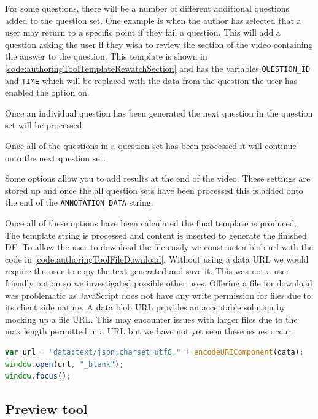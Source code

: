 For some questions, there will be a number of different additional questions added to the question set. One example is when the author has selected that a user may return to a specific point if they fail a question. This will add a question asking the user if they wish to review the section of the video containing the answer to the question. This template is shown in \autoref{code:authoringToolTemplateRewatchSection} and has the variables \lstinline|QUESTION_ID| and \lstinline|TIME| which will be replaced with the data from the question the user has enabled the option on.

Once an individual question has been generated the next question in the question set will be processed.

Once all of the questions in a question set has been processed it will continue onto the next question set.

Some options allow you to add results at the end of the video. These settings are stored up and once the all question sets have been processed this is added onto the end of the \lstinline|ANNOTATION_DATA| string.

Once all of these options have been calculated the final template is produced. The template string is processed and content is inserted to generate the finished \gls{DF}. To allow the user to download the file easily we construct a blob url with the code in \autoref{code:authoringToolFileDownload}. Without using a data URL we would require the user to copy the text generated and save it. This was not a user friendly option so we investigated possible other uses. Offering a file for download was problematic as JavaScript does not have any write permission for files due to its client side nature. A data blob URL provides an acceptable solution by mocking up a file URL. This may encounter issues with larger files due to the max length permitted in a URL but we have not yet seen these issues occur.

\begin{lstlisting}[language=javascript,caption={The final \gls{DF} is offered for downloading using a data blob URL},label={code:authoringToolFileDownload} ]
var url = "data:text/json;charset=utf8," + encodeURIComponent(data);
window.open(url, "_blank");
window.focus();
\end{lstlisting}

\subsection{Preview tool}

